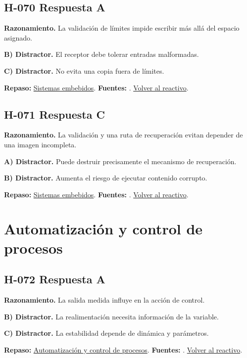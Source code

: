 \subsection*{H-070 \quad Respuesta A}\label{s:H-070}
\textbf{Razonamiento.} La validación de límites impide escribir más allá del espacio asignado.

\textbf{B) Distractor. }El receptor debe tolerar entradas malformadas.

\textbf{C) Distractor. }No evita una copia fuera de límites.

\textbf{Repaso:} \hyperref[sec:h3]{Sistemas embebidos}. \textbf{Fuentes:} \cite{avr,arduino,sensors}. \hyperref[q:H-070]{Volver al reactivo}.\par\medskip

\subsection*{H-071 \quad Respuesta C}\label{s:H-071}
\textbf{Razonamiento.} La validación y una ruta de recuperación evitan depender de una imagen incompleta.

\textbf{A) Distractor. }Puede destruir precisamente el mecanismo de recuperación.

\textbf{B) Distractor. }Aumenta el riesgo de ejecutar contenido corrupto.

\textbf{Repaso:} \hyperref[sec:h3]{Sistemas embebidos}. \textbf{Fuentes:} \cite{avr,arduino,sensors}. \hyperref[q:H-071]{Volver al reactivo}.\par\medskip

\section{Automatización y control de procesos}

\subsection*{H-072 \quad Respuesta A}\label{s:H-072}
\textbf{Razonamiento.} La salida medida influye en la acción de control.

\textbf{B) Distractor. }La realimentación necesita información de la variable.

\textbf{C) Distractor. }La estabilidad depende de dinámica y parámetros.

\textbf{Repaso:} \hyperref[sec:h4]{Automatización y control de procesos}. \textbf{Fuentes:} \cite{control,signals,pid}. \hyperref[q:H-072]{Volver al reactivo}.\par\medskip

